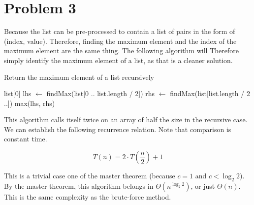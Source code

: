 \documentclass{article}
\newenvironment{problem}[1]{
  \nobreak\section*{Problem #1}
}{}
\newcommand*{\bigTheta}[1]{\ensuremath{\Theta\left(#1\right)}}
\begin{document}
  \begin{problem}{3}
    Because the list can be pre-processed to contain a list of pairs
    in the form of (index, value).  Therefore, finding the maximum
    element and the index of the maximum element are the same thing.
    The following algorithm will Therefore simply identify the 
    maximum element of a list, as that is a cleaner solution.

    \begin{algorithm}[H]
      \caption{Return the maximum element of a list recursively}
      \begin{algorithmic}
            \State \Return list[0]
          \Else
            \State lhs $\gets$ findMax(list[0 .. list.length / 2])
            \State rhs $\gets$ findMax(list[list.length / 2 ..])
            \State \Return max(lhs, rhs)
          \EndIf
        \EndFunction
      \end{algorithmic}
    \end{algorithm}

    This algorithm calls itself twice on an array of half the size
    in the recursive case.  We can establish the following recurrence
    relation.  Note that comparison is constant time.

    \begin{displaymath}
      T(n) = 2 \cdot T\left(\frac{n}{2}\right) + 1
    \end{displaymath}

    This is a trivial case one of the master theorem (because 
    $c = 1$ and $c < \log_2{2}$). By the master theorem, this
    algorithm belongs in \bigTheta{n^{\log_2{2}}}, or just
    \bigTheta{n}.  This is the same complexity as the brute-force
    method.
  \end{problem}
\end{document}

